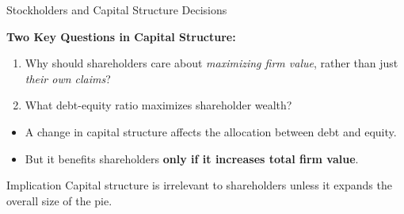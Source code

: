 \begin{frame}{Stockholders and Capital Structure Decisions}
	
	\textbf{Two Key Questions in Capital Structure:}
	\begin{enumerate}
		\item Why should shareholders care about \textit{maximizing firm value}, rather than just \textit{their own claims}?
		\item What debt-equity ratio maximizes shareholder wealth?
	\end{enumerate}
	
	\vspace{0.5cm}
	\begin{itemize}
		\item A change in capital structure affects the allocation between debt and equity.
		\item But it benefits shareholders \textbf{only if it increases total firm value}.
	\end{itemize}
	
	\vspace{0.3cm}
	\begin{alertblock}{Implication}
		Capital structure is irrelevant to shareholders unless it expands the overall size of the pie.
	\end{alertblock}
	
\end{frame}

